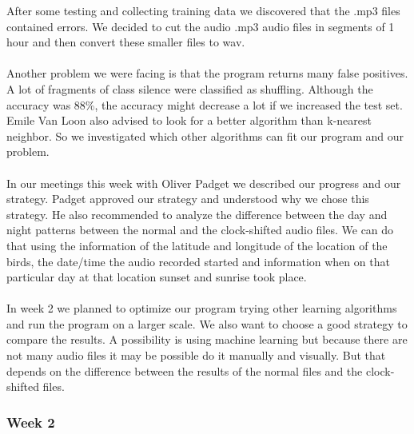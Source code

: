 \documentclass[a4paper]{article}
\begin{document}
After some testing and collecting training data we discovered that the .mp3 files contained errors. We decided to cut the audio .mp3 audio files in segments of 1 hour and then convert these smaller files to wav.\\\\
Another problem we were facing is that the program returns many false positives. A lot of fragments of class silence were classified as shuffling. Although the accuracy was 88\%, the accuracy might decrease a lot if we increased the test set. Emile Van Loon also advised to look for a better algorithm than k-nearest neighbor. So we investigated which other algorithms can fit our program and our problem.\\\\
In our meetings this week with Oliver Padget we described our progress and our strategy. Padget approved our strategy and understood why we chose this strategy. He also recommended to analyze the difference between the day and night patterns between the normal and the clock-shifted audio files. We can do that using the information of the latitude and longitude of the location of the birds, the date/time the audio recorded started and information when on that particular day at that location sunset and sunrise took place.\\\\
In week 2 we planned to optimize our program trying other learning algorithms and run the program on a larger scale. We also want to choose a good strategy to compare the results. A possibility is using machine learning but because there are not many audio files it may be possible do it manually and visually. But that depends on the difference between the results of the normal files and the clock-shifted files. 

\subsubsection*{Week 2}
\end{document}
